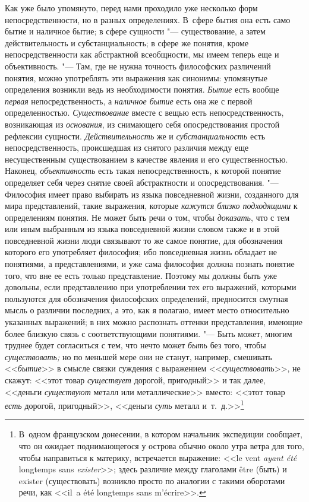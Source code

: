 Как уже было упомянуто, перед нами проходило уже несколько
форм непосредственности, но в разных определениях. В~сфере бытия она есть
само бытие и наличное бытие; в сфере сущности
"--- существование, а затем действительность и
субстанциальность; в сфере же понятия, кроме непосредственности как
абстрактной всеобщности, мы имеем теперь еще и объективность. "---
Там, где не нужна точность философских различений понятия,
можно употреблять эти выражения как синонимы: упомянутые определения
возникли ведь из необходимости понятия. {\em Бытие} есть вообще
{\em первая} непосредственность, а {\em наличное бытие} есть
она же с первой определенностью. {\em Существование}
вместе с вещью есть непосредственность, возникающая из {\em основания}, из
снимающего себя опосредствования простой рефлексии сущности.
{\em Действительность} же и {\em субстанциальность}
есть непосредственность, происшедшая из снятого различия
между еще несущественным существованием в качестве явления и его
существенностью. Наконец, {\em объективность} есть
такая непосредственность, к которой понятие определяет себя через снятие
своей абстрактности и опосредствования. "--- Философия имеет
право выбирать из языка повседневной жизни, созданного для мира
представлений, такие выражения, которые {\em кажутся близко подходящими}
к определениям понятия. Не может быть речи о том, чтобы {\em доказать}, что
с тем или иным выбранным из языка повседневной жизни словом также и в этой
повседневной жизни люди связывают то же самое понятие, для обозначения
которого его употребляет философия; ибо повседневная жизнь
обладает не понятиями, а представлениями, и уже сама философия должна
познать понятие того, что вне ее есть только представление. Поэтому мы
должны быть уже довольны, если представлению при употреблении тех его
выражений, которыми пользуются для обозначения философских определений,
предносится смутная мысль о различии последних, а это, как я полагаю, имеет
место относительно указанных выражений; в них можно распознать оттенки
представления, имеющие более близкую связь с соответствующими понятиями. "---
Быть может, многим труднее будет согласиться с тем, что нечто
может {\em быть} без того, чтобы {\em существовать;}
но по меньшей мере они не станут, например, смешивать <<{\em бытие}>>
в смысле связки суждения с выражением <<{\em существовать}>>, не
скажут: <<этот товар {\em существует}
дорогой, пригодный>> и так далее, <<деньги {\em существуют} металл
или металлические>> вместо: <<этот товар {\em есть} дорогой,
пригодный>>, <<деньги {\em суть} металл и~т.~д.>>\footnote{В~одном
французском донесении, в котором начальник экспедиции
сообщает, что он ожидает поднимающегося у острова обычно около утра ветра
для того, чтобы направиться к материку, встречается выражение: <<le vent
{\em ayant été} longtemps sans
{\em exister}>>\label{bkm:bm64};
здесь различие между глаголами être (быть) и
exister (существовать) возникло просто по аналогии с такими
оборотами речи, как <<il~a été longtemps sans
m'écrire>>.}
